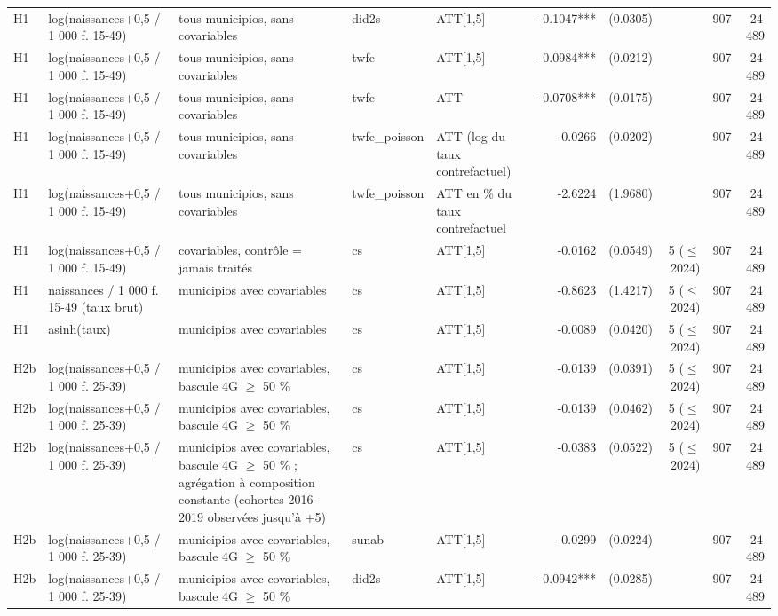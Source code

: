 \begin{table}
\begin{threeparttable}
\begin{tabular}{lp{3.8cm}p{6.6cm}lp{3.5cm}rrrrr}
H1 & log(naissances+0,5 / 1 000 f. 15-49) & tous municipios, sans covariables & did2s & ATT[1,5] & -0.1047*** & (0.0305) &  & 907 & 24\,489 \\
H1 & log(naissances+0,5 / 1 000 f. 15-49) & tous municipios, sans covariables & twfe & ATT[1,5] & -0.0984*** & (0.0212) &  & 907 & 24\,489 \\
H1 & log(naissances+0,5 / 1 000 f. 15-49) & tous municipios, sans covariables & twfe & ATT & -0.0708*** & (0.0175) &  & 907 & 24\,489 \\
H1 & log(naissances+0,5 / 1 000 f. 15-49) & tous municipios, sans covariables & twfe\_poisson & ATT (log du taux contrefactuel) & -0.0266 & (0.0202) &  & 907 & 24\,489 \\
H1 & log(naissances+0,5 / 1 000 f. 15-49) & tous municipios, sans covariables & twfe\_poisson & ATT en \% du taux contrefactuel & -2.6224 & (1.9680) &  & 907 & 24\,489 \\
H1 & log(naissances+0,5 / 1 000 f. 15-49) & covariables, contrôle = jamais traités & cs & ATT[1,5] & -0.0162 & (0.0549) & 5 ($\leq$ 2024) & 907 & 24\,489 \\
H1 & naissances / 1 000 f. 15-49 (taux brut) & municipios avec covariables & cs & ATT[1,5] & -0.8623 & (1.4217) & 5 ($\leq$ 2024) & 907 & 24\,489 \\
H1 & asinh(taux) & municipios avec covariables & cs & ATT[1,5] & -0.0089 & (0.0420) & 5 ($\leq$ 2024) & 907 & 24\,489 \\
H2b & log(naissances+0,5 / 1 000 f. 25-39) & municipios avec covariables, bascule 4G $\geq$ 50 \% & cs & ATT[1,5] & -0.0139 & (0.0391) & 5 ($\leq$ 2024) & 907 & 24\,489 \\
H2b & log(naissances+0,5 / 1 000 f. 25-39) & municipios avec covariables, bascule 4G $\geq$ 50 \% & cs & ATT[1,5] & -0.0139 & (0.0462) & 5 ($\leq$ 2024) & 907 & 24\,489 \\
H2b & log(naissances+0,5 / 1 000 f. 25-39) & municipios avec covariables, bascule 4G $\geq$ 50 \% ; agrégation à composition constante (cohortes 2016-2019 observées jusqu'à +5) & cs & ATT[1,5] & -0.0383 & (0.0522) & 5 ($\leq$ 2024) & 907 & 24\,489 \\
H2b & log(naissances+0,5 / 1 000 f. 25-39) & municipios avec covariables, bascule 4G $\geq$ 50 \% & sunab & ATT[1,5] & -0.0299 & (0.0224) &  & 907 & 24\,489 \\
H2b & log(naissances+0,5 / 1 000 f. 25-39) & municipios avec covariables, bascule 4G $\geq$ 50 \% & did2s & ATT[1,5] & -0.0942*** & (0.0285) &  & 907 & 24\,489 \\

\end{tabular}
\end{threeparttable}
\end{table}
